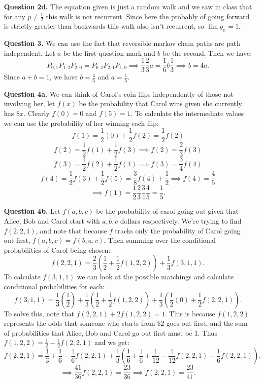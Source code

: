 \documentclass[letterpaper, reqno,11pt]{article}
\begin{document}
{\medskip\noindent\bf Question 2d.} The equation given is just a random walk and we saw in class that for any $p\neq \frac{1}{2}$ this walk is not recurrent. Since here the probably of going forward is strictly greater than backwards this walk also isn't recurrent, so $\lim q_n=1$.

{\medskip\noindent\bf Question 3.} We can use the fact that reversible markov chain paths are path independent. Let $a$ be the first question mark and $b$ be the second. Then we have:
\[
    P_{0,1}P_{1,2}P_{2,0}=P_{0,2}P_{2,1}P_{1,0}\implies \frac{1}{3}\frac{2}{3}a=\frac{1}{6}b \frac{1}{3}\implies b=4a
.\]
Since $a+b=1$, we have $b=\frac{4}{5}$ and $a=\frac{1}{5}$.

{\medskip\noindent\bf Question 4a.} We can think of Carol's coin flips independently of those not involving her, let $f(x)$ be the probability that Carol wins given she currently has \$$x$. Clearly $f(0)=0$ and $f(5)=1$. To calculate the intermediate values we can use the probability of her winning each flip: 
\[
f(1)=\frac{1}{2}(0)+\frac{1}{2}f(2)=\frac{1}{2}f(2)
\]
\[
f(2)=\frac{1}{2}f(1)+\frac{1}{2}f(3)\implies f(2)=\frac{2}{3}f(3)
\]
\[
f(3)=\frac{1}{2}f(2)+\frac{1}{2}f(4) \implies f(3)=\frac{3}{4}f(4)
\]
\[
f(4)=\frac{1}{2}f(3)+\frac{1}{2}f(5)=\frac{3}{8}f(4)+\frac{1}{2}\implies f(4)=\frac{4}{5}
\]
\[
\implies f(1)=\frac{1}{2}\frac{2}{3}\frac{3}{4}\frac{4}{5}=\frac{1}{5}
.\]

{\medskip\noindent\bf Question 4b.} Let $f(a,b,c)$ be the probability of carol going out given that Alice, Bob and Carol start with $a,b,c$ dollars respectively. We're trying to find $f(2, 2, 1)$, and note that because $f$ tracks only the probability of Carol going out first, $f(a,b,c)=f(b,a,c)$. Then summing over the conditional probabilities of Carol being chosen:
\[
f(2,2,1)=\frac{2}{3}\left( \frac{1}{2}+\frac{1}{2}f(1,2,2) \right) +\frac{1}{3}f(3,1,1)
.\]
To calculate $f(3,1,1)$ we can look at the possible matchings and calculate conditional probabilities for each:
\[
f(3,1,1)=\frac{1}{3}\left(\frac{1}{2}\right)+\frac{1}{3}\left( \frac{1}{2}+\frac{1}{2}f(1,2,2) \right) +\frac{1}{3}\left( \frac{1}{2}(0)+\frac{1}{2}f(2,2,1) \right) 
.\]
To solve this, note that $f(2,2,1)+2f(1,2,2)=1$. This is because $f(1,2,2)$ represents the odds that someone who starts from \$2 goes out first, and the sum of probabilities that Alice, Bob and Carol go out first must be 1. Thus $f(1,2,2)=\frac{1}{2}-\frac{1}{2}f(2,2,1)$ and we get:
\[
f(2,2,1)=\frac{1}{3}+\frac{1}{6}-\frac{1}{6}f(2,2,1)+\frac{1}{3}\left( \frac{1}{6}+\frac{1}{6}+\frac{1}{12}-\frac{1}{12}f(2,2,1)+\frac{1}{6}f(2,2,1) \right) 
.\]
\[
\implies \frac{41}{36}f(2,2,1)=\frac{23}{36}\implies f(2,2,1)=\frac{23}{41}
.\]
\end{document}
